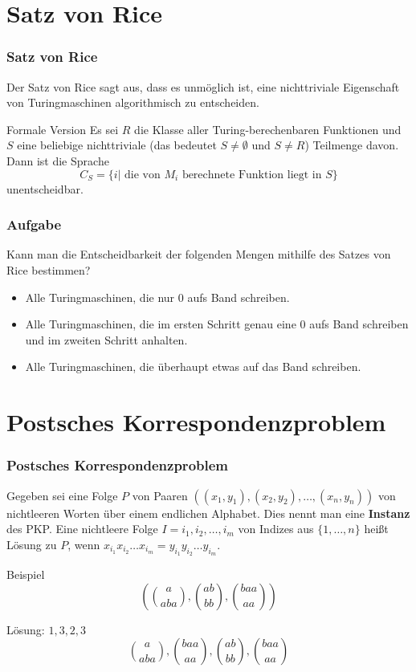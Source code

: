 \section{Satz von Rice}
\begin{frame}
\frametitle{Satz von Rice}
Der Satz von Rice sagt aus, dass es unmöglich ist, eine nichttriviale Eigenschaft von Turingmaschinen algorithmisch zu entscheiden.
\begin{block}{Formale Version}
Es sei $R$ die Klasse aller Turing-berechenbaren Funktionen und $S$ eine beliebige nichttriviale (das bedeutet $S \neq \emptyset$ und $S \neq R$) Teilmenge davon. Dann ist die Sprache
$$ C_S = \{ i |\text{ die von $M_i$ berechnete Funktion liegt in $S$} \} $$
unentscheidbar. 
\end{block}
\end{frame}

\begin{frame}
\frametitle{Aufgabe}
Kann man die Entscheidbarkeit der folgenden Mengen mithilfe des Satzes von Rice bestimmen?
\begin{itemize}
\item Alle Turingmaschinen, die nur $0$ aufs Band schreiben.
\item Alle Turingmaschinen, die im ersten Schritt genau eine $0$ aufs Band schreiben und im zweiten Schritt anhalten. 
\item Alle Turingmaschinen, die überhaupt etwas auf das Band schreiben.
\end{itemize}
\end{frame}

\section{Postsches Korrespondenzproblem}
\begin{frame}
\frametitle{Postsches Korrespondenzproblem}
Gegeben sei eine Folge $P$ von Paaren $((x_1, y_1), (x_2, y_2), \ldots, (x_n,y_n))$ von nichtleeren Worten über einem endlichen Alphabet. Dies nennt man eine \textbf{Instanz} des PKP.
Eine nichtleere Folge $I = i_1, i_2, \ldots, i_m$ von Indizes aus $\{1, \ldots, n\}$ heißt Lösung zu $P$, wenn $x_{i_1}x_{i_2}\ldots{}x_{i_m} = y_{i_1}y_{i_2}\ldots{}y_{i_m}$.
\begin{block}{Beispiel}
\begin{displaymath}
( {a \choose aba}, {ab \choose bb}, {baa \choose aa} )
\end{displaymath}

Lösung: $1,3,2,3$
\begin{displaymath}
{a \choose aba}, {baa \choose aa}, {ab \choose bb}, {baa \choose aa}
\end{displaymath}

\end{block}
\end{frame}

